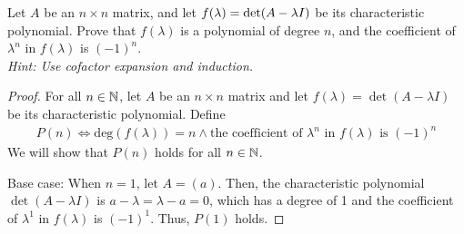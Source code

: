 \begin{question}\label{degree}	\normalfont
Let $A$ be an $n\times n$ matrix, and let $f(\lambda) = \textup{det}(A - \lambda I)$ be its characteristic polynomial. Prove that $f(\lambda)$ is a polynomial of degree $n$, and the coefficient of $\lambda^n$ in $f(\lambda)$ is $(-1)^n$. \\
\emph{Hint: Use cofactor expansion and induction.}	
\end{question}

\begin{proof}
    \renewcommand{\qedsymbol}{$\blacksquare$}
    For all $n\in\mathbb N$, let $A$ be an $n\times n$ matrix and let $f(\lambda)=\det(A-\lambda I)$ be its characteristic polynomial.
    Define
    \[
        \begin{aligned}
            P(n)\iff \text{deg}(f(\lambda))=n\land\text{the coefficient of }\lambda^n\text{ in }f(\lambda)\text{ is } (-1)^n
        \end{aligned}
    \]   
    We will show that $P(n)$ holds for all $n\in\mathbb N$.

    Base case: When $n=1$, let $A=(a)$.
    Then, the characteristic polynomial $\det(A-\lambda I)$ is $a-\lambda=\lambda-a=0$, which has a degree of 1 and the coefficient of $\lambda^1$ in $f(\lambda)$ is $(-1)^1$.
    Thus, $P(1)$ holds.


\end{proof}

